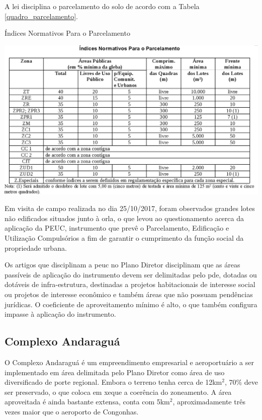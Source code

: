 	A lei disciplina o parcelamento do solo de acordo com a Tabela \ref{quadro_parcelamento}.
	
	\begin{table}[H]
		\centering
		\caption{Índices Normativos Para o Parcelamento}
		\includegraphics[width=1\textwidth]{img/id_parcelamento.png}
		\label{quadro_parcelamento}
	\end{table}
	
	Em visita de campo realizada no dia 25/10/2017, foram observados grandes lotes não edificados situados junto à orla, o que levou ao questionamento acerca da aplicação da PEUC, instrumento que prevê o Parcelamento, Edificação e Utilização Compulsórios a fim de garantir o cumprimento da função social da propriedade urbana. 
	
	Os artigos que disciplinam a \gls{peuc} no Plano Diretor disciplinam que as áreas passíveis de aplicação do instrumento devem ser delimitadas pelo \gls{pde}, dotadas ou dotáveis de infra-estrutura, destinadas a projetos habitacionais de interesse social ou projetos de interesse econômico e também áreas que não possuam pendências jurídicas. O coeficiente de aproveitamento mínimo é alto, o que também configura impasse à aplicação do instrumento.
	
	\subsection{Complexo Andaraguá}
	
	O Complexo Andaraguá é um empreendimento empresarial e aeroportuário a ser implementado em área delimitada pelo Plano Diretor como área de uso diversificado de porte regional. Embora o terreno tenha cerca de 12km$^{2}$, 70\% deve ser preservado, o que coloca em xeque a coerência do zoneamento. A área aproveitada é ainda bastante extensa, conta com 5km$^{2}$, aproximadamente três vezes maior que o aeroporto de Congonhas.
	

